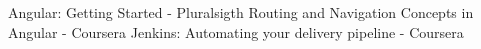 %
%
%


\begin{scholarship}	
					{Angular: Getting Started - Pluralsigth}
					{Routing and Navigation Concepts in Angular - Coursera}
					{Jenkins: Automating your delivery pipeline - Coursera}     
\end{scholarship}
